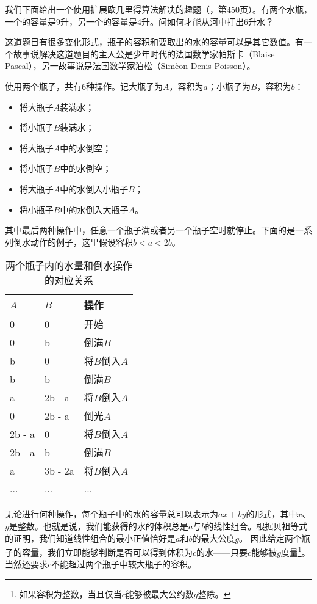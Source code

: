 \documentclass[UTF8]{article}
\begin{document}
我们下面给出一个使用扩展欧几里得算法解决的趣题（\cite{LiuXinyu2017}，第450页）。有两个水瓶，一个的容量是9升，另一个的容量是4升。问如何才能从河中打出6升水？

这道题目有很多变化形式，瓶子的容积和要取出的水的容量可以是其它数值。有一个故事说解决这道题目的主人公是少年时代的法国数学家帕斯卡（Blaise Pascal），另一故事说是法国数学家泊松（Sim\`{e}on Denis Poisson）。

使用两个瓶子，共有6种操作。记大瓶子为$A$，容积为$a$；小瓶子为$B$，容积为$b$：

\begin{itemize}
\item 将大瓶子$A$装满水；
\item 将小瓶子$B$装满水；
\item 将大瓶子$A$中的水倒空；
\item 将小瓶子$B$中的水倒空；
\item 将大瓶子$A$中的水倒入小瓶子$B$；
\item 将小瓶子$B$中的水倒入大瓶子$A$。
\end{itemize}

其中最后两种操作中，任意一个瓶子满或者另一个瓶子空时就停止。下面的是一系列倒水动作的例子，这里假设容积$b < a < 2b$。

\begin{table}[htbp]
\centering
\begin{tabular}{l|l|l}
$A$ & $B$ & 操作 \\
\hline
0 & 0 & 开始 \\
0 & b & 倒满$B$ \\
b & 0 & 将$B$倒入$A$ \\
b & b & 倒满$B$ \\
a & 2b - a & 将$B$倒入$A$ \\
0 & 2b - a & 倒光$A$ \\
2b - a & 0 & 将$B$倒入$A$ \\
2b - a & b & 倒满$B$ \\
a & 3b - 2a & 将$B$倒入$A$ \\
... & ... & ... \\
\end{tabular}
\caption{两个瓶子内的水量和倒水操作的对应关系} \label{tab:jug-ops}
\end{table}

无论进行何种操作，每个瓶子中的水的容量总可以表示为$ax + by$的形式，其中$x$、$y$是整数。也就是说，我们能获得的水的体积总是$a$与$b$的线性组合。根据贝祖等式的证明，我们知道线性组合的最小正值恰好是$a$和$b$的最大公度$g$。
因此给定两个瓶子的容量，我们立即能够判断是否可以得到体积为$c$的水——只要$c$能够被$g$度量\footnote{如果容积为整数，当且仅当$c$能够被最大公约数$g$整除。}。当然还要求$c$不能超过两个瓶子中较大瓶子的容积。
\end{document}
